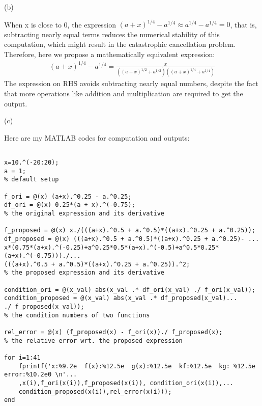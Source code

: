\documentclass[12pt]{article}
\begin{document}
(b)

When x is close to 0, the expression $(a+x)^{1/4}-a^{1/4} \approx a^{1/4}-a^{1/4}=0$, that is, subtracting nearly equal terms reduces the numerical stability of this computation, which might result in the catastrophic cancellation problem.
Therefore, here we propose a mathematically equivalent expression:
\begin{equation*}
\begin{split}
(a+x)^{1/4}-a^{1/4} = \frac{x}{((a+x)^{1/2}+a^{1/2})((a+x)^{1/4}+a^{1/4})}
\end{split}
\end{equation*}
The expression on RHS avoids subtracting nearly equal numbers, despite the fact that more operations like addition and multiplication are required to get the output.

(c)

Here are my MATLAB codes for computation and outputs:\\

\begin{lstlisting}

x=10.^(-20:20);
a = 1;
% default setup

f_ori = @(x) (a+x).^0.25 - a.^0.25;
df_ori = @(x) 0.25*(a + x).^(-0.75);
% the original expression and its derivative

f_proposed = @(x) x./(((a+x).^0.5 + a.^0.5)*((a+x).^0.25 + a.^0.25));
df_proposed = @(x) (((a+x).^0.5 + a.^0.5)*((a+x).^0.25 + a.^0.25)- ...
x*(0.75*(a+x).^(-0.25)+a^0.25*0.5*(a+x).^(-0.5)+a^0.5*0.25*(a+x).^(-0.75)))./...
(((a+x).^0.5 + a.^0.5)*((a+x).^0.25 + a.^0.25)).^2;
% the proposed expression and its derivative

condition_ori = @(x_val) abs(x_val .* df_ori(x_val) ./ f_ori(x_val));
condition_proposed = @(x_val) abs(x_val .* df_proposed(x_val)...
./ f_proposed(x_val));
% the condition numbers of two functions

rel_error = @(x) (f_proposed(x) - f_ori(x))./ f_proposed(x); 
% the relative error wrt. the proposed expression

for i=1:41
    fprintf('x:%9.2e  f(x):%12.5e  g(x):%12.5e  kf:%12.5e  kg: %12.5e  error:%10.2e0 \n'...
    ,x(i),f_ori(x(i)),f_proposed(x(i)), condition_ori(x(i)),...
    condition_proposed(x(i)),rel_error(x(i)));
end

\end{lstlisting}
\end{document}
